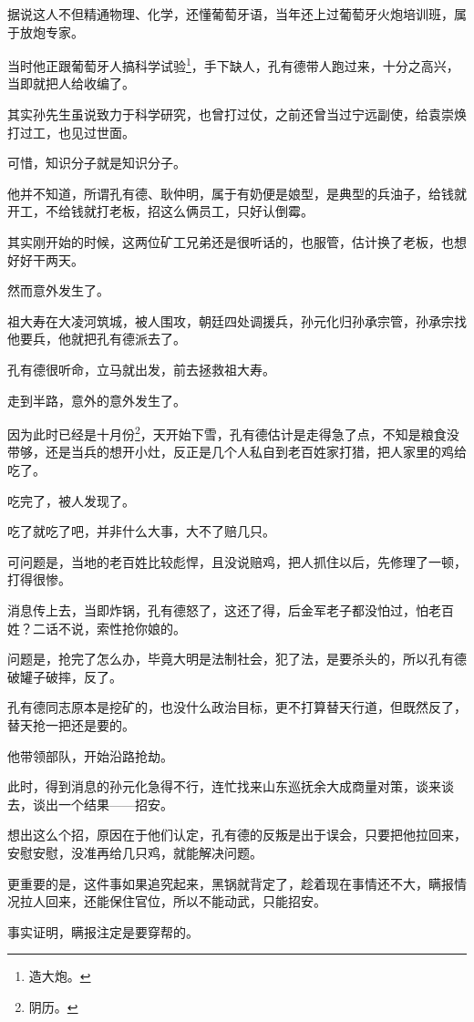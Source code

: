 \begin{multicols}{\theparacolNo}
		据说这人不但精通物理、化学，还懂葡萄牙语，当年还上过葡萄牙火炮培训班，属于放炮专家。

		当时他正跟葡萄牙人搞科学试验\footnote{造大炮。}，手下缺人，孔有德带人跑过来，十分之高兴，当即就把人给收编了。

		其实孙先生虽说致力于科学研究，也曾打过仗，之前还曾当过宁远副使，给袁崇焕打过工，也见过世面。

		可惜，知识分子就是知识分子。

		他并不知道，所谓孔有德、耿仲明，属于有奶便是娘型，是典型的兵油子，给钱就开工，不给钱就打老板，招这么俩员工，只好认倒霉。

		其实刚开始的时候，这两位矿工兄弟还是很听话的，也服管，估计换了老板，也想好好干两天。

		然而意外发生了。

		祖大寿在大凌河筑城，被人围攻，朝廷四处调援兵，孙元化归孙承宗管，孙承宗找他要兵，他就把孔有德派去了。

		孔有德很听命，立马就出发，前去拯救祖大寿。

		走到半路，意外的意外发生了。

		因为此时已经是十月份\footnote{阴历。}，天开始下雪，孔有德估计是走得急了点，不知是粮食没带够，还是当兵的想开小灶，反正是几个人私自到老百姓家打猎，把人家里的鸡给吃了。

		吃完了，被人发现了。

		吃了就吃了吧，并非什么大事，大不了赔几只。

		可问题是，当地的老百姓比较彪悍，且没说赔鸡，把人抓住以后，先修理了一顿，打得很惨。

		消息传上去，当即炸锅，孔有德怒了，这还了得，后金军老子都没怕过，怕老百姓？二话不说，索性抢你娘的。

		问题是，抢完了怎么办，毕竟大明是法制社会，犯了法，是要杀头的，所以孔有德破罐子破摔，反了。

		孔有德同志原本是挖矿的，也没什么政治目标，更不打算替天行道，但既然反了，替天抢一把还是要的。

		他带领部队，开始沿路抢劫。

		此时，得到消息的孙元化急得不行，连忙找来山东巡抚余大成商量对策，谈来谈去，谈出一个结果——招安。

		想出这么个招，原因在于他们认定，孔有德的反叛是出于误会，只要把他拉回来，安慰安慰，没准再给几只鸡，就能解决问题。

		更重要的是，这件事如果追究起来，黑锅就背定了，趁着现在事情还不大，瞒报情况拉人回来，还能保住官位，所以不能动武，只能招安。

		事实证明，瞒报注定是要穿帮的。


\end{multicols}
